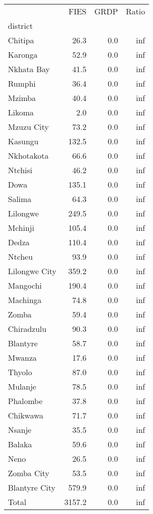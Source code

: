 \begin{tabular}{lrrr}
\toprule
{} &    FIES &  GRDP &  Ratio \\
district      &         &       &        \\
\midrule
Chitipa       &    26.3 &   0.0 &    inf \\
Karonga       &    52.9 &   0.0 &    inf \\
Nkhata Bay    &    41.5 &   0.0 &    inf \\
Rumphi        &    36.4 &   0.0 &    inf \\
Mzimba        &    40.4 &   0.0 &    inf \\
Likoma        &     2.0 &   0.0 &    inf \\
Mzuzu City    &    73.2 &   0.0 &    inf \\
Kasungu       &   132.5 &   0.0 &    inf \\
Nkhotakota    &    66.6 &   0.0 &    inf \\
Ntchisi       &    46.2 &   0.0 &    inf \\
Dowa          &   135.1 &   0.0 &    inf \\
Salima        &    64.3 &   0.0 &    inf \\
Lilongwe      &   249.5 &   0.0 &    inf \\
Mchinji       &   105.4 &   0.0 &    inf \\
Dedza         &   110.4 &   0.0 &    inf \\
Ntcheu        &    93.9 &   0.0 &    inf \\
Lilongwe City &   359.2 &   0.0 &    inf \\
Mangochi      &   190.4 &   0.0 &    inf \\
Machinga      &    74.8 &   0.0 &    inf \\
Zomba         &    59.4 &   0.0 &    inf \\
Chiradzulu    &    90.3 &   0.0 &    inf \\
Blantyre      &    58.7 &   0.0 &    inf \\
Mwanza        &    17.6 &   0.0 &    inf \\
Thyolo        &    87.0 &   0.0 &    inf \\
Mulanje       &    78.5 &   0.0 &    inf \\
Phalombe      &    37.8 &   0.0 &    inf \\
Chikwawa      &    71.7 &   0.0 &    inf \\
Nsanje        &    35.5 &   0.0 &    inf \\
Balaka        &    59.6 &   0.0 &    inf \\
Neno          &    26.5 &   0.0 &    inf \\
Zomba City    &    53.5 &   0.0 &    inf \\
Blantyre City &   579.9 &   0.0 &    inf \\
Total         &  3157.2 &   0.0 &    inf \\
\bottomrule
\end{tabular}
